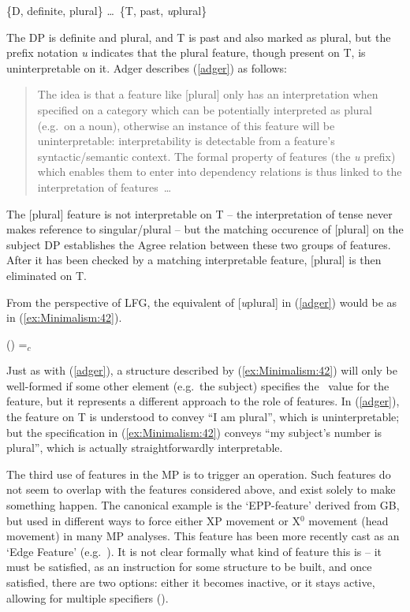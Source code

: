 \documentclass[output=paper,hidelinks]{langscibook}
\begin{document}
\ea\label{adger}\relax
\{D, definite, plural\} \ldots\ \{T, past, \textit{u}plural\}
\z

The DP is definite and plural, and T is past and also marked as
plural, but the prefix notation \textit{u} indicates that the plural
feature, though present on T, is uninterpretable on it. Adger
describes (\ref{adger}) as follows:
\begin{quote}
The idea is that a feature like [plural] only has an interpretation
when specified on a category which can be potentially interpreted as
plural (e.g.~on a noun), otherwise an instance of this feature will be
uninterpretable: interpretability is detectable from a feature’s
syntactic/semantic context. The formal property of features (the
\textit{u} prefix) which enables them to enter into dependency relations
is thus linked to the interpretation of features\ \ldots~ \citep[189]{adger10}
\end{quote}
The [plural] feature is not interpretable on T -- the interpretation
of tense never makes reference to singular/plural -- but the matching
occurence of [plural] on the subject DP establishes the {Agree}
relation between these two groups of features. After it has been
checked by a matching interpretable feature, [plural] is then
eliminated on T.

From the perspective of LFG, the equivalent of
[\textit{u}plural] in (\ref{adger}) would be as in (\ref{ex:Minimalism:42}).

\ea\label{ex:Minimalism:42}
(\UP\SUBJ\NUM) {=$_c$} \PL
\z


\largerpage[2]
Just as with (\ref{adger}), a structure described by (\ref{ex:Minimalism:42}) will
only be well-formed if some other element (e.g.~the subject) specifies
the \PL\ value for the feature, but it represents a different approach
to the role of features. In (\ref{adger}), the feature on T is
understood to convey ``I am plural'', which is uninterpretable; but
the specification in (\ref{ex:Minimalism:42}) conveys ``my subject's number is
plural'', which is actually straightforwardly interpretable.

The third use of features in the MP is to trigger an operation. Such
features do not seem to overlap with the features considered above,
and exist solely to make something happen. The canonical example is
the `EPP-feature' derived from GB, but used in different ways to
force either XP movement or X$^0$ movement (head movement) in many
MP analyses. This feature has been more recently cast as an `Edge
Feature' (e.g.~\citealp{chomsky2005three}). It is not clear formally
what kind of feature this is -- it must be satisfied, as an
instruction for some structure to be built, and once satisfied, there
are two options: either it becomes inactive, or it stays active,
allowing for multiple specifiers (\citealp[11]{chomsky07}).
\end{document}
